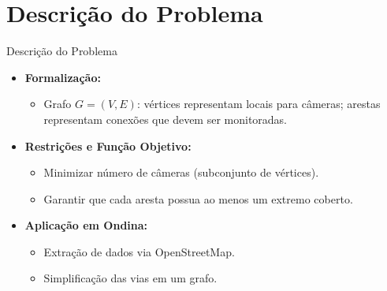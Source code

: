 \documentclass[aspectratio=169,xcolor=table]{beamer}
\begin{document}
\section{Descrição do Problema}
\begin{frame}{Descrição do Problema}
    \begin{itemize}
        \item \textbf{Formalização:}
        \begin{itemize}
            \item Grafo \(G=(V, E)\): vértices representam locais para câmeras; arestas representam conexões que devem ser monitoradas.
        \end{itemize}
        \item \textbf{Restrições e Função Objetivo:}
        \begin{itemize}
            \item Minimizar número de câmeras (subconjunto de vértices).
            \item Garantir que cada aresta possua ao menos um extremo coberto.
        \end{itemize}
        \item \textbf{Aplicação em Ondina:}
        \begin{itemize}
            \item Extração de dados via OpenStreetMap.
            \item Simplificação das vias em um grafo.
        \end{itemize}
    \end{itemize}
\end{frame}

\end{document}
